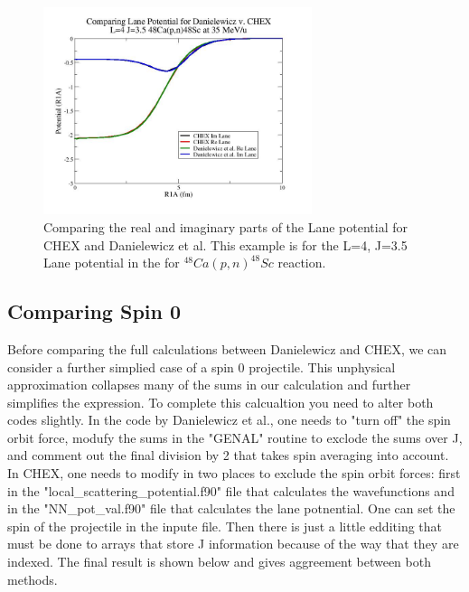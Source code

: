 \documentclass{article}
\begin{document}
\begin{figure}[H]
	\centering 
    \includegraphics[width=0.7\textwidth]{ComparingLaneFigure.jpg}
    \caption{Comparing the real and imaginary parts of the Lane potential for CHEX and Danielewicz et al.  This example is for the L=4, J=3.5 Lane potential in the for $^{48}Ca(p,n)^{48}Sc$ reaction.}
    \label{fig:imwfcompare}
\end{figure}

\subsection{Comparing Spin 0}

Before comparing the full calculations between Danielewicz and CHEX, we can consider a further simplied case of a spin 0 projectile.  This unphysical approximation collapses many of the sums in our calculation and further simplifies the expression.  To complete this calcualtion you need to alter both codes slightly.  In the code by Danielewicz et al., one needs to "turn off" the spin orbit force, modufy the sums in the "GENAL" routine to exclode the sums over J, and comment out the final division by 2 that takes spin averaging into account.  In CHEX, one needs to modify in two places to exclude the spin orbit forces: first in the "local\_scattering\_potential.f90" file that calculates the wavefunctions and in the "NN\_pot\_val.f90" file that calculates the lane potnential. One can set the spin of the projectile in the inpute file.  Then there is just a little edditing that must be done to arrays that store J information because of the way that they are indexed.  The final result is shown below and gives aggreement between both methods.
\end{document}
